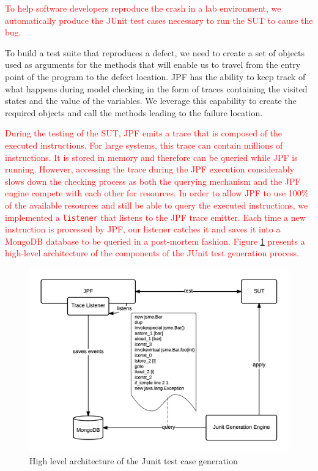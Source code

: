 \documentclass[times, doublespace]{smrauth}
\newcommand{\red}[1]{\textcolor{red}{#1}}
\begin{document}
{\red{To help software developers reproduce the crash in a lab
environment, we automatically produce the JUnit test cases
necessary to run the SUT to cause the bug.}

To build a test suite that reproduces a defect, we need to create
a set of objects used as arguments for the methods that will
enable us to travel from the entry point of the program to the
defect location. JPF has the ability to keep track of what
happens during model checking in the form of traces
containing the visited states and the value of the variables. We
leverage this capability to create the required objects and call
the methods leading to the failure location.

\red{During the testing of the SUT, JPF emits a trace that is composed of the executed instructions.
For large systems, this trace can contain millions of instructions. It is stored in memory and therefore can be queried while JPF is running.
However, accessing the trace during the JPF execution considerably slows down the checking process as both the querying mechanism and the JPF engine compete with each other for resources.
In order to allow JPF to use 100\% of the available resources and still be able to query the executed instructions, we implemented a {\tt listener} that listens to the JPF trace emitter.
Each time a new instruction is processed by JPF, our listener catches it and saves it into a MongoDB database to be queried in a post-mortem fashion. Figure \ref{fig:jcharming-unittest} presents a high-level architecture of the components of the JUnit test generation process.}

\begin{figure}
  \centering
    \includegraphics[scale=0.8]{media/unittest.png}
    \caption{High level architecture of the Junit test case generation
    \label{fig:jcharming-unittest}}
\end{figure}


}
\end{document}
